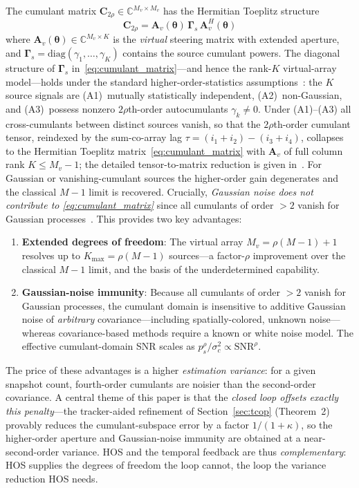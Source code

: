 \documentclass[journal]{IEEEtran}
\newcommand{\vect}[1]{\boldsymbol{#1}}
\newcommand{\mat}[1]{\mathbf{#1}}
\newcommand{\C}{\mathbb{C}}
\newcommand{\diag}{\mathrm{diag}}
\begin{document}
The cumulant matrix $\mat{C}_{2\rho} \in \C^{M_v \times M_v}$ has the Hermitian Toeplitz structure
\begin{equation}
\mat{C}_{2\rho} = \mat{A}_v(\vect{\theta})\,\mat{\Gamma}_s\,\mat{A}_v^H(\vect{\theta})
\label{eq:cumulant_matrix}
\end{equation}
where $\mat{A}_v(\vect{\theta}) \in \C^{M_v \times K}$ is the \emph{virtual} steering matrix with extended aperture, and $\mat{\Gamma}_s = \diag(\gamma_1, \ldots, \gamma_K)$ contains the source cumulant powers. The diagonal structure of $\mat{\Gamma}_s$ in~\eqref{eq:cumulant_matrix}---and hence the rank-$K$ virtual-array model---holds under the standard higher-order-statistics assumptions~\cite{dogan1995cumulant,porat1991doa,chevalier2006hos}: the $K$ source signals are (A1)~mutually statistically independent, (A2)~non-Gaussian, and (A3)~possess nonzero $2\rho$th-order autocumulants $\gamma_k\neq0$. Under (A1)--(A3) all cross-cumulants between distinct sources vanish, so that the $2\rho$th-order cumulant tensor, reindexed by the sum-co-array lag $\tau=(i_1{+}i_2)-(i_3{+}i_4)$, collapses to the Hermitian Toeplitz matrix~\eqref{eq:cumulant_matrix} with $\mat{A}_v$ of full column rank $K\le M_v-1$; the detailed tensor-to-matrix reduction is given in~\cite{choi2015underdetermined,dogan1995cumulant}. For Gaussian or vanishing-cumulant sources the higher-order gain degenerates and the classical $M-1$ limit is recovered. Crucially, \emph{Gaussian noise does not contribute to \eqref{eq:cumulant_matrix}} since all cumulants of order $> 2$ vanish for Gaussian processes~\cite{mendel1991tutorial}. This provides two key advantages:
\begin{enumerate}
\item \textbf{Extended degrees of freedom}: The virtual array $M_v = \rho(M-1)+1$ resolves up to $K_{\max} = \rho(M-1)$ sources---a factor-$\rho$ improvement over the classical $M-1$ limit, and the basis of the underdetermined capability.
\item \textbf{Gaussian-noise immunity}: Because all cumulants of order $>2$ vanish for Gaussian processes, the cumulant domain is insensitive to additive Gaussian noise of \emph{arbitrary} covariance---including spatially-colored, unknown noise---whereas covariance-based methods require a known or white noise model. The effective cumulant-domain SNR scales as $p_s^{\rho}/\sigma_c^2\propto\mathrm{SNR}^{\rho}$.
\end{enumerate}

The price of these advantages is a higher \emph{estimation variance}: for a given snapshot count, fourth-order cumulants are noisier than the second-order covariance. A central theme of this paper is that the \emph{closed loop offsets exactly this penalty}---the tracker-aided refinement of Section~\ref{sec:tcop} (Theorem~2) provably reduces the cumulant-subspace error by a factor $1/(1{+}\kappa)$, so the higher-order aperture and Gaussian-noise immunity are obtained at a near-second-order variance. HOS and the temporal feedback are thus \emph{complementary}: HOS supplies the degrees of freedom the loop cannot, the loop the variance reduction HOS needs.
\end{document}
